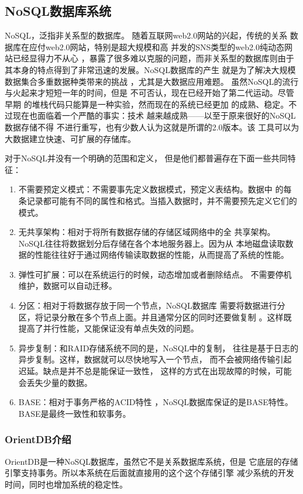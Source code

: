 \subsection{NoSQL数据库系统}
NoSQL，泛指非关系型的数据库。
随着互联网web2.0网站的兴起，传统的关系
数据库在应付web2.0网站，特别是超大规模和高
并发的SNS类型的web2.0纯动态网站已经显得力不从心
，暴露了很多难以克服的问题，而非关系型的数据库则由于
其本身的特点得到了非常迅速的发展。NoSQL数据库的产生
就是为了解决大规模数据集合多重数据种类带来的挑战
，尤其是大数据应用难题。
虽然NoSQL的流行与火起来才短短一年的时间，但是
不可否认，现在已经开始了第二代运动。尽管早期
的堆栈代码只能算是一种实验，然而现在的系统已经更加
的成熟、稳定。不过现在也面临着一个严酷的事实：技术
越来越成熟——以至于原来很好的NoSQL数据存储不得
不进行重写，也有少数人认为这就是所谓的2.0版本。该
工具可以为大数据建立快速、可扩展的存储库。

对于NoSQL并没有一个明确的范围和定义，
但是他们都普遍存在下面一些共同特征：
\begin{enumerate}[fullwidth,itemindent=2em]
	\item   不需要预定义模式：不需要事先定义数据模式，预定义表结构。数据中
	的每条记录都可能有不同的属性和格式。当插入数据时，并不需要预先定义它们的模式。
\item 	无共享架构：相对于将所有数据存储的存储区域网络中的全
共享架构。NoSQL往往将数据划分后存储在各个本地服务器上。因为从
本地磁盘读取数据的性能往往好于通过网络传输读取数据的性能，从而提高了系统的性能。
\item 	弹性可扩展：可以在系统运行的时候，动态增加或者删除结点。
不需要停机维护，数据可以自动迁移。
\item 	分区：相对于将数据存放于同一个节点，NoSQL数据库
需要将数据进行分区，将记录分散在多个节点上面。并且通常分区的同时还要做复制
。这样既提高了并行性能，又能保证没有单点失效的问题。
\item 	异步复制：和RAID存储系统不同的是，NoSQL中的复制，
往往是基于日志的异步复制。这样，数据就可以尽快地写入一个节点，
而不会被网络传输引起迟延。缺点是并不总是能保证一致性，
这样的方式在出现故障的时候，可能会丢失少量的数据。
\item 	BASE：相对于事务严格的ACID特性
	，NoSQL数据库保证的是BASE特性。BASE是最终一致性和软事务。
\end{enumerate}
\subsubsection{OrientDB介绍}
OrientDB是一种NoSQL数据库，虽然它不是关系数据库系统，但是
它底层的存储引擎支持事务。所以本系统在后面就直接用的这个这个存储引擎
减少系统的开发时间，同时也增加系统的稳定性。
